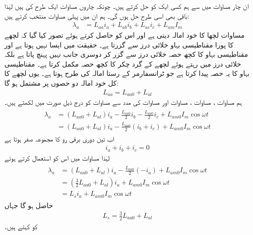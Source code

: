 ان چار مساوات میں سے ہم کسی ایک کو  حل کرتے ہیں۔ چونکہ چاروں مساوات ایک طرح کی ہیں لہٰذا  باقی بھی اسی طرح حل ہوں گی۔ ہم ان میں  پہلی  مساوات منتخب کرتے ہیں:
\begin{align}\label{مساوات_معاصر_ارتباط_الف_کل}
\lambda_a&=L_{aa} i_a+L_{ab} i_b +L_{ac} i_c+L_{am} I_m
\end{align}
 مساوات   لچھا    کا خود امالہ دیتی ہے اور اس کو حاصل کرتے ہوئے تصور کیا گیا کہ لچھے کا پورا مقناطیسی بہاو خلائی درز سے گزرتا ہے۔ حقیقت میں ایسا نہیں ہوتا ہے اور مقناطیسی بہاو  کا کچھ حصہ خلائی درز  سے گزر کر دوسری جانب نہیں پہنچ پاتا ہے بلکہ خلائی درز میں رہتے ہوئے لچھے کے گرد چکر کا کچھ حصہ مکمل کرتا ہے۔  مقناطیسی بہاو کا یہ حصہ     پیدا کرتا ہے جو  ٹرانسفارمر کے رستا امالہ کی طرح ہوتا ہے۔ یوں لچھے کا کل خود امالہ   دو حصوں پر مشتمل ہو گا:
\begin{align}\label{مساوات_معاصر_الف_خود_کل_امالہ}
L_{aa}=L_{aa0}+L_{al}
\end{align}
ہم مساوات ،  مساوات ،  مساوات   اور مساوات   کی مدد سے مساوات   کو درج ذیل صورت میں لکھتے ہیں۔
\begin{gather}
\begin{aligned}\label{مساوات_معاصر_ارتباط_الف}
\lambda_a&=\left(L_{aa0}+L_{al} \right)i_a-\frac{L_{aa0}}{2} i_b -\frac{L_{aa0}}{2} i_c+L_{am0} I_m \cos \omega t \\
&=\left(L_{aa0}+L_{al} \right)i_a-\frac{L_{aa0}}{2} \left( i_b+i_c \right)+L_{am0} I_m \cos \omega t
\end{aligned}
\end{gather}
اب تین دوری برقی رو کا مجموعہ صفر ہوتا ہے 
\begin{align}
i_a+i_b+i_c=0
\end{align}
لہٰذا مساوات   میں اس کو استعمال کرتے ہوئے
\begin{gather}
\begin{aligned}
\lambda_a&=\left(L_{aa0}+L_{al} \right)i_a-\frac{L_{aa0}}{2} \left( -i_a \right)+L_{am0} I_m \cos \omega t\\
&=\left(\frac{3}{2} L_{aa0}+L_{al} \right)i_a+L_{am0} I_m \cos \omega t\\
&=L_s i_a+L_{am0} I_m \cos \omega t
\end{aligned}
\end{gather}
حاصل ہو گا جہاں
\begin{align}\label{مساوات_معاصر_معاصر_امالہ}
L_s=\frac{3}{2} L_{aa0}+L_{al}
\end{align}
کو  کہتے ہیں۔

